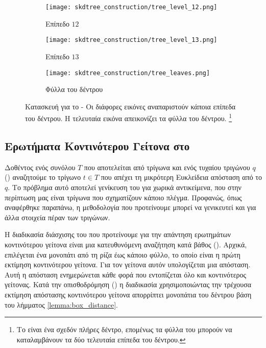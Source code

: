 \begin{figure}[h]
\begin{subfigure}{0.5\textwidth}
        \centering
        \texttt{[image: skdtree\_construction/tree\_level\_12.png]}
        \caption{Επίπεδο $12$}        
    \end{subfigure}
    \begin{subfigure}{0.5\textwidth}
        \centering
        \texttt{[image: skdtree\_construction/tree\_level\_13.png]}
        \caption{Επίπεδο $13$}        
    \end{subfigure}
    \begin{subfigure}{0.5\textwidth}
        \centering
        \texttt{[image: skdtree\_construction/tree\_leaves.png]}
        \caption{Φύλλα του δέντρου}        
    \end{subfigure}

    \caption[Κατασκευή ]{
        Κατασκευή  για το  - 
        Οι διάφορες εικόνες 
        αναπαριστούν κάποια επίπεδα του δέντρου.
        Η τελευταία εικόνα απεικονίζει τα φύλλα του 
        δέντρου. \footnote{Το  είναι ένα 
        σχεδόν πλήρες δέντρο, επομένως τα φύλλα του 
        μπορούν να καταλαμβάνουν τα δύο τελευταία επίπεδα
        του δέντρου.}
    }
    \label{fig:tree_construction}
\end{figure}

\subsection{Ερωτήματα Κοντινότερου Γείτονα στο }
Δοθέντος ενός συνόλου $T$ που αποτελείται από τρίγωνα και ενός 
τυχαίου τριγώνου $q$ () αναζητούμε 
το τρίγωνο $t \in T$ που απέχει τη μικρότερη Ευκλείδεια απόσταση 
από το $q$. 
Το πρόβλημα αυτό αποτελεί γενίκευση του  για χωρικά 
αντικείμενα, που στην περίπτωση μας είναι τρίγωνα που 
σχηματίζουν κάποιο πλέγμα.
Προφανώς, όπως αναφέρθηκε παραπάνω, η μεθοδολογία  
που προτείνουμε μπορεί να γενικευτεί και για άλλα στοιχεία
πέραν των τριγώνων.

Η διαδικασία διάσχισης του  που προτείνουμε
για την απάντηση ερωτημάτων κοντινότερου γείτονα είναι μια 
κατευθυνόμενη αναζήτηση κατά βάθος ().
Αρχικά, επιλέγεται ένα μονοπάτι από τη ρίζα έως κάποιο φύλλο, το 
οποίο είναι η πρώτη εκτίμηση κοντινότερου γείτονα.
Για τον γείτονα αυτόν υπολογίζεται μια απόσταση.
Αυτή η απόσταση ενημερώνεται κάθε φορά που εντοπίζεται 
όλο και κοντινότερος γείτονας.
Κατά την οπισθοδρόμηση () η διαδικασία χρησιμοποιώντας 
την τρέχουσα εκτίμηση απόστασης κοντινότερου γείτονα απορρίπτει 
μονοπάτια του δέντρου βάση του λήμματος \ref{lemma:box_distance}.


